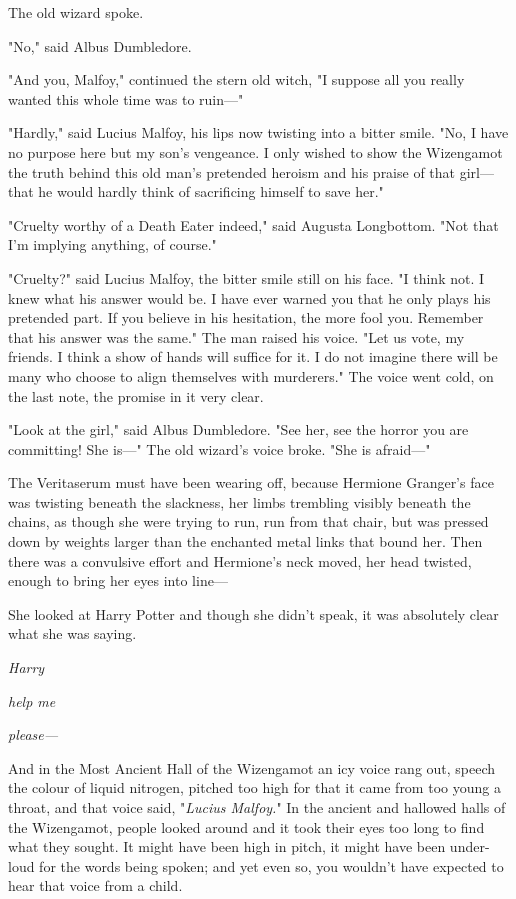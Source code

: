 The old wizard spoke.

"No," said Albus Dumbledore.

"And you, Malfoy," continued the stern old witch, "I suppose all you really
wanted this whole time was to ruin---"

"Hardly," said Lucius Malfoy, his lips now twisting into a bitter smile. "No, I
have no purpose here but my son's vengeance. I only wished to show the
Wizengamot the truth behind this old man's pretended heroism and his praise of
that girl---that he would hardly think of sacrificing himself to save her."

"Cruelty worthy of a Death Eater indeed," said Augusta Longbottom. "Not that
I'm implying anything, of course."

"Cruelty?" said Lucius Malfoy, the bitter smile still on his face. "I think
not. I knew what his answer would be. I have ever warned you that he only plays
his pretended part. If you believe in his hesitation, the more fool you.
Remember that his answer was the same." The man raised his voice. "Let us vote,
my friends. I think a show of hands will suffice for it. I do not imagine there
will be many who choose to align themselves with murderers." The voice went
cold, on the last note, the promise in it very clear.

"Look at the girl," said Albus Dumbledore. "See her, see the horror you are
committing! She is---" The old wizard's voice broke. "She is afraid---"

The Veritaserum must have been wearing off, because Hermione Granger's face was
twisting beneath the slackness, her limbs trembling visibly beneath the chains,
as though she were trying to run, run from that chair, but was pressed down by
weights larger than the enchanted metal links that bound her. Then there was a
convulsive effort and Hermione's neck moved, her head twisted, enough to bring
her eyes into line---

She looked at Harry Potter and though she didn't speak, it was absolutely clear
what she was saying.

\emph{Harry}

\emph{help me}

\emph{please---}

And in the Most Ancient Hall of the Wizengamot an icy voice rang out, speech
the colour of liquid nitrogen, pitched too high for that it came from too young
a throat, and that voice said, "\emph{Lucius Malfoy.}"
\later
In the ancient and hallowed halls of the Wizengamot, people looked around and
it took their eyes too long to find what they sought. It might have been high
in pitch, it might have been under-loud for the words being spoken; and yet
even so, you wouldn't have expected to hear that voice from a child.

